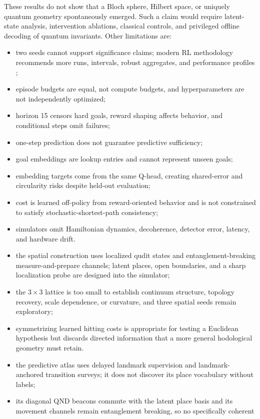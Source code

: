 \documentclass[11pt]{article}
\begin{document}
These results do not show that a Bloch sphere, Hilbert space, or uniquely
quantum geometry spontaneously emerged. Such a claim would require latent-state
analysis, intervention ablations, classical controls, and privileged offline
decoding of quantum invariants. Other limitations are:
\begin{itemize}
 \item two seeds cannot support significance claims; modern RL methodology
 recommends more runs, intervals, robust aggregates, and performance profiles
 \cite{agarwal2021};
 \item episode budgets are equal, not compute budgets, and hyperparameters are
 not independently optimized;
 \item horizon 15 censors hard goals, reward shaping affects behavior, and
 conditional steps omit failures;
 \item one-step prediction does not guarantee predictive sufficiency;
 \item goal embeddings are lookup entries and cannot represent unseen goals;
 \item embedding targets come from the same Q-head, creating shared-error and
 circularity risks despite held-out evaluation;
 \item cost is learned off-policy from reward-oriented behavior and is not
 constrained to satisfy stochastic-shortest-path consistency;
 \item simulators omit Hamiltonian dynamics, decoherence, detector error,
 latency, and hardware drift.
 \item the spatial construction uses localized qudit states and
 entanglement-breaking measure-and-prepare channels; latent places, open
 boundaries, and a sharp localization probe are designed into the simulator;
 \item the $3\times3$ lattice is too small to establish continuum structure,
 topology recovery, scale dependence, or curvature, and three spatial seeds
 remain exploratory;
 \item symmetrizing learned hitting costs is appropriate for testing a
 Euclidean hypothesis but discards directed information that a more general
 hodological geometry must retain.
 \item the predictive atlas uses delayed landmark supervision and
 landmark-anchored transition surveys; it does not discover its place
 vocabulary without labels;
 \item its diagonal QND beacons commute with the latent place basis and its
 movement channels remain entanglement breaking, so no specifically coherent

\end{itemize}
\end{document}

